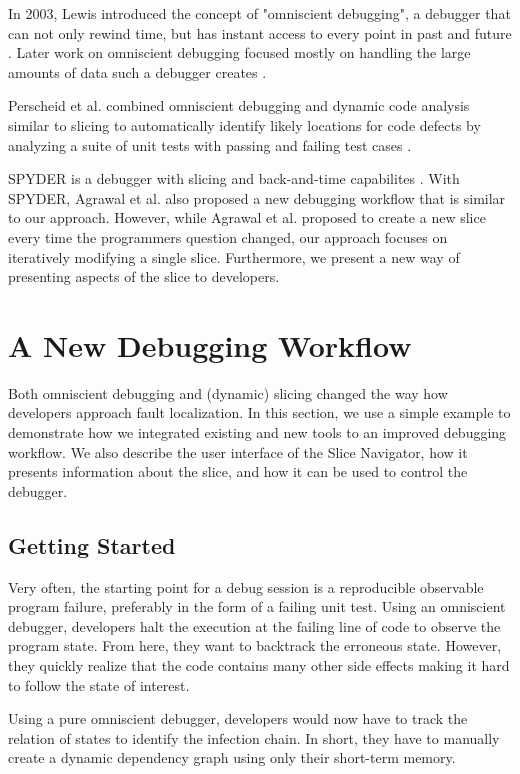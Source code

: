 ﻿\documentclass[
      english,
			conference,
      ]{IEEEtran}
\begin{document}
In 2003, Lewis introduced the concept of "omniscient debugging", a debugger that can not only rewind time, but has instant access to every point in past and future \cite{lewis_debugging_2003}.
Later work on omniscient debugging focused mostly on handling the large amounts of data such a debugger creates \cite{pothier_scalable_2007, lienhard_practical_2008}.

Perscheid et al. combined omniscient debugging and dynamic code analysis similar to slicing to automatically identify likely locations for code defects by analyzing a suite of unit tests with passing and failing test cases \cite{perscheid_test-driven_2012}.

SPYDER is a debugger with slicing and back-and-time capabilites \cite{agrawal_debugging_1993}.
With SPYDER, Agrawal et al. also proposed a new debugging workflow that is similar to our approach.
However, while Agrawal et al. proposed to create a new slice every time the programmers question changed, our approach focuses on iteratively modifying a single slice.
Furthermore, we present a new way of presenting aspects of the slice to developers.

\section{A New Debugging Workflow}
\label{sec:workflow}

Both omniscient debugging and (dynamic) slicing changed the way how developers approach fault localization.
In this section, we use a simple example to demonstrate how we integrated existing and new tools to an improved debugging workflow.
We also describe the user interface of the Slice Navigator, how it presents information about the slice, and how it can be used to control the debugger.

\subsection{Getting Started}

Very often, the starting point for a debug session is a reproducible observable program failure, preferably in the form of a failing unit test.
Using an omniscient debugger, developers halt the execution at the failing line of code to observe the program state.
From here, they want to backtrack the erroneous state.
However, they quickly realize that the code contains many other side effects making it hard to follow the state of interest.

Using a pure omniscient debugger, developers would now have to track the relation of states to identify the infection chain. In short, they have to manually create a dynamic dependency graph using only their short-term memory.
 
\end{document}
